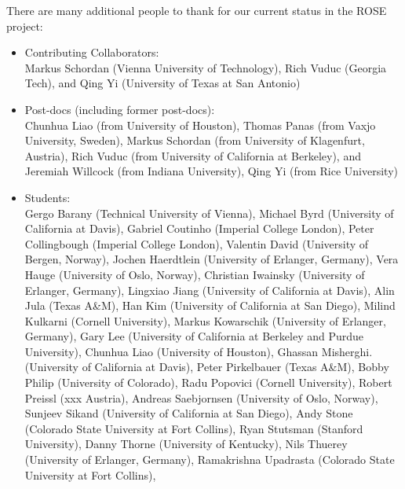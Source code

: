      There are many additional people to thank for our current status in 
the ROSE project:
\begin{itemize}
     \item Contributing Collaborators: \\
           Markus Schordan (Vienna University of Technology),
           Rich Vuduc (Georgia Tech), and
           Qing Yi (University of Texas at San Antonio)
     \item Post-docs (including former post-docs): \\
           Chunhua Liao (from University of Houston),
           Thomas Panas (from Vaxjo University, Sweden),
           Markus Schordan (from University of Klagenfurt, Austria),
           Rich Vuduc (from University of California at Berkeley), and
           Jeremiah Willcock (from Indiana University),
           Qing Yi (from Rice University)
     \item Students: \\
           Gergo Barany (Technical University of Vienna),
           Michael Byrd (University of California at Davis),
           Gabriel Coutinho (Imperial College London),
           Peter Collingbough (Imperial College London),
           Valentin David (University of Bergen, Norway),
           Jochen Haerdtlein (University of Erlanger, Germany),
           Vera Hauge (University of Oslo, Norway),
           Christian Iwainsky (University of Erlanger, Germany),
           Lingxiao Jiang (University of California at Davis),
           Alin Jula (Texas A\&M),
           Han Kim (University of California at San Diego),
           Milind Kulkarni (Cornell University),
           Markus Kowarschik (University of Erlanger, Germany),
           Gary Lee (University of California at Berkeley and Purdue University),
           Chunhua Liao (University of Houston),
           Ghassan Misherghi. (University of California at Davis),
           Peter Pirkelbauer (Texas A\&M),
           Bobby Philip (University of Colorado),
           Radu Popovici (Cornell University),
           Robert Preissl (xxx Austria),
           Andreas Saebjornsen (University of Oslo, Norway),
           Sunjeev Sikand (University of California at San Diego),
           Andy Stone (Colorado State University at Fort Collins),
           Ryan Stutsman (Stanford University),
           Danny Thorne (University of Kentucky), 
           Nils Thuerey (University of Erlanger, Germany), 
           Ramakrishna Upadrasta (Colorado State University at Fort Collins),

\end{itemize}
